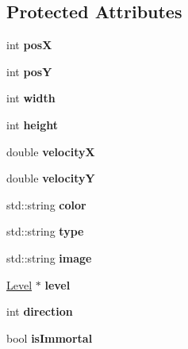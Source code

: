 \subsection*{Protected Attributes}
\begin{DoxyCompactItemize}
\item 
\hypertarget{classWorldElement_af31e79a9cb76f50c2f259d21851c5c80}{
int {\bfseries posX}}
\label{classWorldElement_af31e79a9cb76f50c2f259d21851c5c80}

\item 
\hypertarget{classWorldElement_ac08589dd50c2c845f09c401fc1949cef}{
int {\bfseries posY}}
\label{classWorldElement_ac08589dd50c2c845f09c401fc1949cef}

\item 
\hypertarget{classWorldElement_ab880bf3562dd510386fb42421d1cb090}{
int {\bfseries width}}
\label{classWorldElement_ab880bf3562dd510386fb42421d1cb090}

\item 
\hypertarget{classWorldElement_a42cbe1e0a9e835032ec6ac3f88d2ebd5}{
int {\bfseries height}}
\label{classWorldElement_a42cbe1e0a9e835032ec6ac3f88d2ebd5}

\item 
\hypertarget{classWorldElement_ab39a6657cac9ceb1564721586adbb832}{
double {\bfseries velocityX}}
\label{classWorldElement_ab39a6657cac9ceb1564721586adbb832}

\item 
\hypertarget{classWorldElement_a1dff1385510d90b7206b971973ca0381}{
double {\bfseries velocityY}}
\label{classWorldElement_a1dff1385510d90b7206b971973ca0381}

\item 
\hypertarget{classWorldElement_a6a7c5e750589800bbad8996c8dfdcb28}{
std::string {\bfseries color}}
\label{classWorldElement_a6a7c5e750589800bbad8996c8dfdcb28}

\item 
\hypertarget{classWorldElement_afedeeb03a3fee1aa749b27296b455394}{
std::string {\bfseries type}}
\label{classWorldElement_afedeeb03a3fee1aa749b27296b455394}

\item 
\hypertarget{classWorldElement_af26f8b7769f706ba6f824668a43a8e61}{
std::string {\bfseries image}}
\label{classWorldElement_af26f8b7769f706ba6f824668a43a8e61}

\item 
\hypertarget{classWorldElement_a2a679a5790d2aeb1ebd377b5c033be3b}{
\hyperlink{classLevel}{Level} $\ast$ {\bfseries level}}
\label{classWorldElement_a2a679a5790d2aeb1ebd377b5c033be3b}

\item 
\hypertarget{classWorldElement_a7c162afeb06255d5959bf568458718c5}{
int {\bfseries direction}}
\label{classWorldElement_a7c162afeb06255d5959bf568458718c5}

\item 
\hypertarget{classWorldElement_a94b627737eeecc2f933392886cd4d728}{
bool {\bfseries isImmortal}}
\label{classWorldElement_a94b627737eeecc2f933392886cd4d728}

\end{DoxyCompactItemize}


